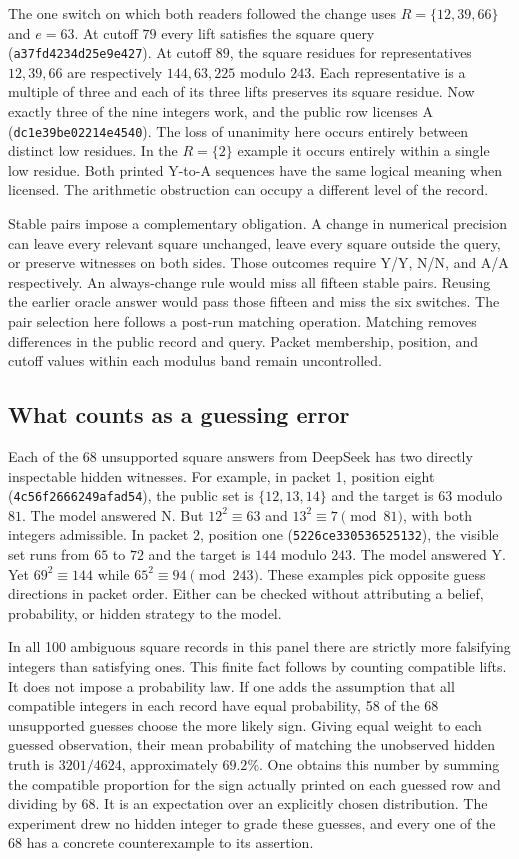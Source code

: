 \documentclass[12pt,letterpaper]{article}
\begin{document}
The one switch on which both readers followed the change uses $R=\{12,39,66\}$ and $e=63$. At cutoff $79$ every lift satisfies the square query (\texttt{a37fd4234d25e9e427}). At cutoff $89$, the square residues for representatives $12,39,66$ are respectively $144,63,225$ modulo $243$. Each representative is a multiple of three and each of its three lifts preserves its square residue. Now exactly three of the nine integers work, and the public row licenses A (\texttt{dc1e39be02214e4540}). The loss of unanimity here occurs entirely between distinct low residues. In the $R=\{2\}$ example it occurs entirely within a single low residue. Both printed Y-to-A sequences have the same logical meaning when licensed. The arithmetic obstruction can occupy a different level of the record.

Stable pairs impose a complementary obligation. A change in numerical precision can leave every relevant square unchanged, leave every square outside the query, or preserve witnesses on both sides. Those outcomes require Y/Y, N/N, and A/A respectively. An always-change rule would miss all fifteen stable pairs. Reusing the earlier oracle answer would pass those fifteen and miss the six switches. The pair selection here follows a post-run matching operation. Matching removes differences in the public record and query. Packet membership, position, and cutoff values within each modulus band remain uncontrolled.

\subsection{What counts as a guessing error}

Each of the 68 unsupported square answers from DeepSeek has two directly inspectable hidden witnesses. For example, in packet 1, position eight (\texttt{4c56f2666249afad54}), the public set is $\{12,13,14\}$ and the target is $63$ modulo $81$. The model answered N. But $12^2\equiv63$ and $13^2\equiv7\pmod{81}$, with both integers admissible. In packet 2, position one (\texttt{5226ce330536525132}), the visible set runs from $65$ to $72$ and the target is $144$ modulo $243$. The model answered Y. Yet $69^2\equiv144$ while $65^2\equiv94\pmod{243}$. These examples pick opposite guess directions in packet order. Either can be checked without attributing a belief, probability, or hidden strategy to the model.

In all 100 ambiguous square records in this panel there are strictly more falsifying integers than satisfying ones. This finite fact follows by counting compatible lifts. It does not impose a probability law. If one adds the assumption that all compatible integers in each record have equal probability, 58 of the 68 unsupported guesses choose the more likely sign. Giving equal weight to each guessed observation, their mean probability of matching the unobserved hidden truth is $3201/4624$, approximately $69.2\%$. One obtains this number by summing the compatible proportion for the sign actually printed on each guessed row and dividing by 68. It is an expectation over an explicitly chosen distribution. The experiment drew no hidden integer to grade these guesses, and every one of the 68 has a concrete counterexample to its assertion.
\end{document}
